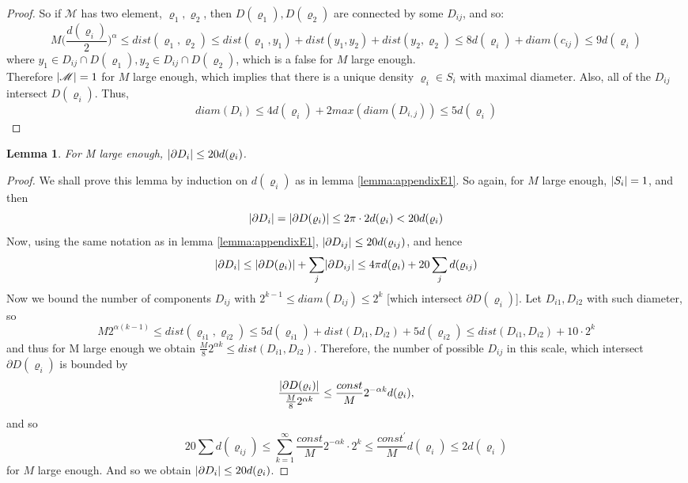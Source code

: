 \documentclass[11pt,reqno]{article}
\DeclarePairedDelimiter\abs{\lvert}{\rvert}%
\newtheorem{lemma}[thm]{Lemma}
\theoremstyle{definition}
\numberwithin{equation}{section}
\begin{document}
\begin{proof}
So if $\mathscr{M}$ has two element, $\varrho_1, \varrho_2$, then $D(\varrho_1), D(\varrho_2)$ are connected by some $D_{ij}$, and so:
$$
M\Big( \frac{d(\varrho_i)}{2} \Big)^\alpha \leq dist(\varrho_1, \varrho_2) \leq dist(\varrho_1, y_1) + dist(y_1, y_2) + dist(y_2, \varrho_2) \leq 8d(\varrho_i) + diam(c_{ij}) \leq 9d(\varrho_i)
$$
where $y_1 \in D_{ij} \cap D(\varrho_1), y_2 \in D_{ij} \cap D(\varrho_2)$, which is a false for $M$ large enough.\\
Therefore $\abs{\mathscr{M}} = 1$ for $M$ large enough, which implies that there is a unique density $\varrho_i \in S_i$ with maximal diameter. Also, all of the $D_{ij}$ intersect $D(\varrho_i)$. Thus,
$$
diam(D_i) \leq 4d(\varrho_i) + 2max(diam(D_{i,j})) \leq 5d(\varrho_i)
$$
\end{proof}

\begin{lemma} \label{lemma:appendixE2}
For M large enough, $\abs{\partial D_i} \leq 20 d(\varrho_i)$.
\end{lemma}

\begin{proof}
We shall prove this lemma by induction on $d(\varrho_i)$ as in lemma \eqref{lemma:appendixE1}. So again, for $M$ large enough, $\abs{S_i} = 1$, and then
$$
\abs{\partial D_i} = \abs{\partial D(\varrho_i)} \leq 2\pi\cdot 2d(\varrho_i) < 20d(\varrho_i)
$$
Now, using the same notation as in lemma \eqref{lemma:appendixE1}, $\abs{\partial D_{ij}} \leq 20 d(\varrho_{ij})$, and hence
$$
\abs{\partial D_i} \leq \abs{\partial D(\varrho_i)} + \sum_j \abs{\partial D_{ij}} \leq
4\pi d(\varrho_i) + 20 \sum_j d(\varrho_{ij})
$$
Now we bound the number of components $D_{ij}$ with $2^{k-1} \leq diam(D_{ij}) \leq 2^k$ [which intersect $\partial D(\varrho_i)$]. Let $D_{i1}, D_{i2}$ with such diameter, so
$$
M2^{\alpha(k-1)} \leq dist(\varrho_{i1}, \varrho_{i2}) \leq 5d(\varrho_{i1}) + dist(D_{i1}, D_{i2}) + 5d(\varrho_{i2}) \leq dist(D_{i1}, D_{i2}) + 10 \cdot 2^k
$$
and thus for M large enough we obtain $\frac{M}{8}2^{\alpha k} \leq dist(D_{i1}, D_{i2})$. Therefore, the number of possible $D_{ij}$ in this scale, which intersect $\partial D(\varrho_i)$ is bounded by
$$
\frac{\abs{\partial D(\varrho_i)}}{\frac{M}{8}2^{\alpha k}} \leq \frac{const}{M} 2^{-\alpha k} d(\varrho_i),
$$
and so
$$
20 \sum d(\varrho_{ij}) \leq \sum_{k=1}^\infty \frac{const}{M} 2^{-\alpha k} \cdot 2^k \leq \frac{const^\prime}{M} d(\varrho_i) \leq 2d(\varrho_i)
$$
for $M$ large enough. And so we obtain $\abs{\partial D_i} \leq 20d(\varrho_i)$.
\end{proof}
\end{document}
